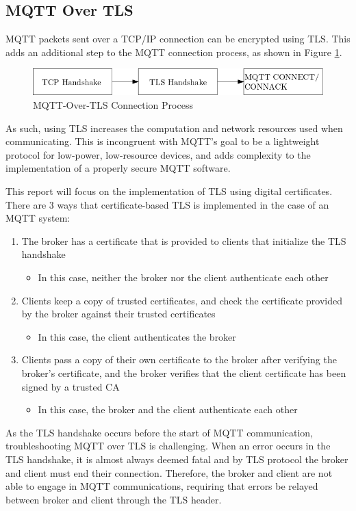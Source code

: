 \documentclass[12pt]{article}
\begin{document}
\subsection{MQTT Over TLS}
MQTT packets sent over a TCP/IP connection can be encrypted using TLS. This adds an additional step to the MQTT connection process, as shown in Figure \ref{fig:connection}.\par
\begin{figure}[!htb]
\centering
	\includegraphics[scale=0.5]{tcp-tls-mqtt.png}
	\caption{MQTT-Over-TLS Connection Process\label{fig:connection}}
\end{figure}
As such, using TLS increases the computation and network resources used when communicating. This is incongruent with MQTT's goal to be a lightweight protocol for low-power, low-resource devices, and adds complexity to the implementation of a properly secure MQTT software.\par
This report will focus on the implementation of TLS using digital certificates. There are 3 ways that certificate-based TLS is implemented in the case of an MQTT system:
\begin{enumerate}
	\item The broker has a certificate that is provided to clients that initialize the TLS handshake
	\begin{itemize}
		\item In this case, neither the broker nor the client authenticate each other
	\end{itemize}
	\item Clients keep a copy of trusted certificates, and check the certificate provided by the broker against their trusted certificates
	\begin{itemize}
		\item In this case, the client authenticates the broker
	\end{itemize}
	\item Clients pass a copy of their own certificate to the broker after verifying the broker's certificate, and the broker verifies that the client certificate has been signed by a trusted CA
	\begin{itemize}
		\item In this case, the broker and the client authenticate each other
	\end{itemize}
\end{enumerate}
As the TLS handshake occurs before the start of MQTT communication, troubleshooting MQTT over TLS is challenging. When an error occurs in the TLS handshake, it is almost always deemed fatal and by TLS protocol the broker and client must end their connection\cite{tls1.2errors}. Therefore, the broker and client are not able to engage in MQTT communications, requiring that errors be relayed between broker and client through the TLS header.
\end{document}
